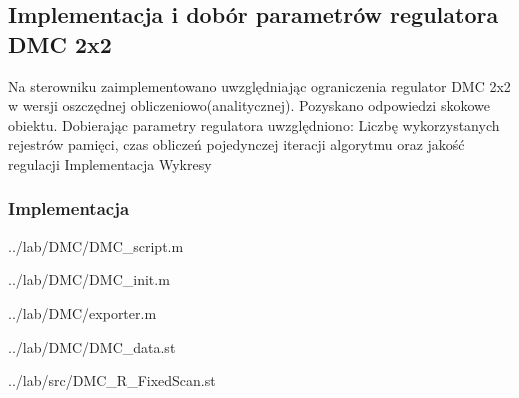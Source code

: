 \subsection{Implementacja i dobór parametrów regulatora DMC 2x2}
\label{lab:zad4}



\ifdefined\CompileFigures
%    
\fi

Na	sterowniku	zaimplementowano	uwzględniając	ograniczenia	regulator	DMC	
2x2	w	wersji	oszczędnej	obliczeniowo(analitycznej). Pozyskano	odpowiedzi	
skokowe	obiektu.	Dobierając	parametry	regulatora	uwzględniono:
Liczbę	wykorzystanych	rejestrów	pamięci,	czas	obliczeń	pojedynczej	iteracji	
algorytmu	oraz	jakość	regulacji
Implementacja	
Wykresy

\subsubsection{Implementacja}

\lstset{style=custommatlab}
\ifdefined\CompileListings
    
        {../lab/DMC/DMC_script.m}
\fi

\lstset{style=custommatlab}
\ifdefined\CompileListings
    
        {../lab/DMC/DMC_init.m}
    \newpage
\fi

\lstset{style=custommatlab}
\ifdefined\CompileListings
    
        {../lab/DMC/exporter.m}
    \newpage
\fi

\lstset{style=custommatlab}
\ifdefined\CompileListings
    
        {../lab/DMC/DMC_data.st}
    \newpage
\fi

\lstset{style=customc}
\ifdefined\CompileListings
    
        {../lab/src/DMC_R_FixedScan.st}
    \newpage
\fi

